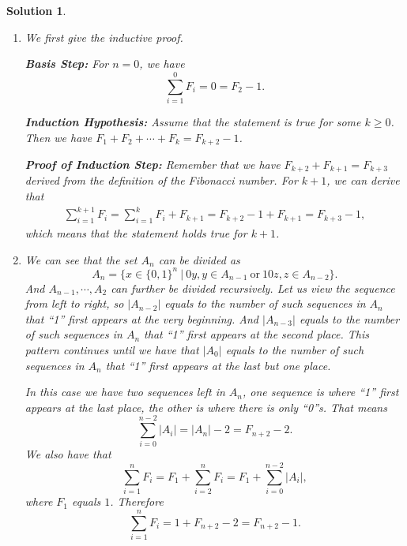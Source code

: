\documentclass[12pt,a4]{article}
\newtheorem*{solution}{Solution}
\begin{document}
\begin{solution} \quad
       \begin{enumerate}
          \item We first give the inductive proof.
          
          \textbf{Basis Step:} For $n=0$, we have 
          $$
          \sum_{i=1}^0F_i=0=F_2-1.
          $$
        

         \textbf{Induction Hypothesis:} Assume that the statement is true for some $k\geq0$. Then we have $F_1+F_2+\cdots+F_k=F_{k+2}-1$.

         \textbf{Proof of Induction Step:} Remember that we have $F_{k+2}+F_{k+1}=F_{k+3}$ derived from the definition of the Fibonacci number. For $k+1$, we can derive that
         \begin{align*}
            \sum_{i=1}^{k+1}F_i=\sum_{i=1}^kF_i+F_{k+1}
            =F_{k+2}-1+F_{k+1}=F_{k+3}-1,
         \end{align*}
         which means that the statement holds true for $k+1$.

         \item We can see that the set $A_n$ can be  divided as 
         $$
         A_n=\{x\in\{ 0,1\}^n\ |\ 0y, y\in A_{n-1}\  \text{or}\ 10z,z\in A_{n-2} \}.
         $$ 
         And $A_{n-1},\cdots,A_2$ can further be divided recursively. Let us view the sequence from left to right, so $|A_{n-2}|$ equals to the number of such sequences in $A_n$ that ``1'' first appears at the very beginning. And $|A_{n-3}|$ equals to the number of such sequences in $A_n$ that ``1'' first appears at the second place. This pattern continues until we have that $|A_0|$ equals to the number of such sequences in $A_n$ that ``1'' first appears at the last but one place.

         In this case we have two sequences left in $A_n$, one sequence is where ``1'' first appears at the last place, the other is where there is only ``0''s. That means 
         $$
         \sum_{i=0}^{n-2}|A_i|=|A_n|-2=F_{n+2}-2.
         $$
          We also have that 
         $$
         \sum_{i=1}^nF_i=F_1+\sum_{i=2}^nF_i=F_1+\sum_{i=0}^{n-2}|A_i|,
         $$ 
         where $F_1$ equals $1$. Therefore
         $$
         \sum_{i=1}^nF_i=1+F_{n+2}-2=F_{n+2}-1.
         $$
       \end{enumerate}
    \end{solution}
\end{document}
